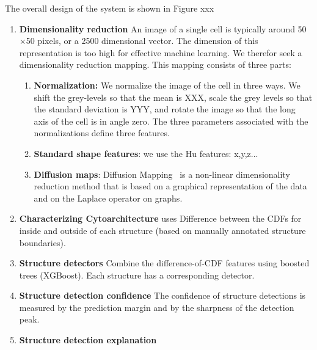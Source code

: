 \documentclass[runningheads]{llncs}
\begin{document}
The overall design of the system is shown in Figure xxx

\begin{enumerate}
\item{\bf Dimensionality reduction}
An image of a single cell is typically around 50$\times$50 pixels, or a 2500 dimensional vector. The dimension of this representation is too high for effective machine learning. We therefor seek a dimensionality reduction mapping. This mapping consists of three parts:
\begin{enumerate}
    \item {\bf Normalization:} We normalize the image of the cell in three ways. We 
    shift the grey-levels so that the mean is XXX, scale the grey levels so that the standard deviation is YYY, and rotate the image so that the long axis of the cell is in angle zero. The three parameters associated with the normalizations define three features.
    \item {\bf Standard shape features}: we use the Hu features: x,y,z...
    \item{ \bf  Diffusion maps}: Diffusion Mapping~\cite{Belkin,
        Coifman} is a non-linear dimensionality reduction method that
      is based on a graphical representation of the data and on the
      Laplace operator on graphs.
      \end{enumerate}
\item{\bf Characterizing Cytoarchitecture} uses Difference between the CDFs for inside and outside of each structure (based on manually annotated structure boundaries). 
\item {\bf Structure detectors} Combine the difference-of-CDF features using boosted trees (XGBoost). Each structure has a corresponding detector.
\item {\bf Structure detection confidence} The confidence of structure
  detections is measured by the prediction margin and by the sharpness
  of the detection peak.
  \item {\bf Structure detection explanation}
\end{enumerate}

\end{document}
